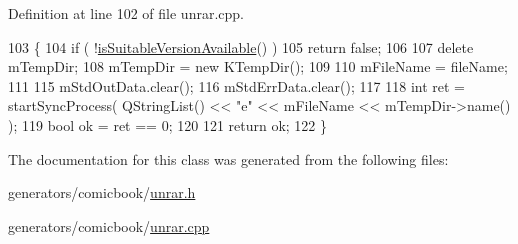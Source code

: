 Definition at line 102 of file unrar.\+cpp.


\begin{DoxyCode}
103 \{
104     \textcolor{keywordflow}{if} ( !\hyperlink{classUnrar_a142581395536a82553f2855962e14055}{isSuitableVersionAvailable}() )
105         \textcolor{keywordflow}{return} \textcolor{keyword}{false};
106 
107     \textcolor{keyword}{delete} mTempDir;
108     mTempDir = \textcolor{keyword}{new} KTempDir();
109 
110     mFileName = fileName;
111 
115     mStdOutData.clear();
116     mStdErrData.clear();
117 
118     \textcolor{keywordtype}{int} ret = startSyncProcess( QStringList() << \textcolor{stringliteral}{"e"} << mFileName << mTempDir->name() );
119     \textcolor{keywordtype}{bool} ok = ret == 0;
120 
121     \textcolor{keywordflow}{return} ok;
122 \}
\end{DoxyCode}


The documentation for this class was generated from the following files\+:\begin{DoxyCompactItemize}
\item 
generators/comicbook/\hyperlink{unrar_8h}{unrar.\+h}\item 
generators/comicbook/\hyperlink{unrar_8cpp}{unrar.\+cpp}\end{DoxyCompactItemize}
